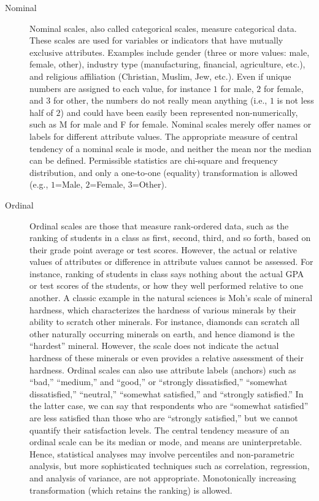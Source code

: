 \begin{description}
	\item[Nominal] Nominal scales, also called categorical scales, measure categorical data. These scales are used for variables or indicators that have mutually exclusive attributes. Examples include gender (three or more values: male, female, other), industry type (manufacturing, financial, agriculture, etc.), and religious affiliation (Christian, Muslim, Jew, etc.). Even if unique numbers are assigned to each value, for instance $ 1 $ for male, $ 2 $ for female, and $ 3 $ for other, the numbers do not really mean anything (i.e., $ 1 $ is not less half of $ 2 $) and could have been easily been represented non-numerically, such as M for male and F for female. Nominal scales merely offer names or labels for different attribute values. The appropriate measure of central tendency of a nominal scale is mode, and neither the mean nor the median can be defined. Permissible statistics are chi-square and frequency distribution, and only a one-to-one (equality) transformation is allowed (e.g., $ 1 $=Male, $ 2 $=Female, $ 3 $=Other).
	
	\item[Ordinal] Ordinal scales are those that measure rank-ordered data, such as the ranking of students in a class as first, second, third, and so forth, based on their grade point average or test scores. However, the actual or relative values of attributes or difference in attribute values cannot be assessed. For instance, ranking of students in class says nothing about the actual GPA or test scores of the students, or how they well performed relative to one another. A classic example in the natural sciences is Moh's scale of mineral hardness, which characterizes the hardness of various minerals by their ability to scratch other minerals. For instance, diamonds can scratch all other naturally occurring minerals on earth, and hence diamond is the ``hardest'' mineral. However, the scale does not indicate the actual hardness of these minerals or even provides a relative assessment of their hardness. Ordinal scales can also use attribute labels (anchors) such as ``bad,'' ``medium,'' and ``good,'' or ``strongly dissatisfied,'' ``somewhat dissatisfied,'' ``neutral,'' ``somewhat satisfied,'' and ``strongly satisfied.'' In the latter case, we can say that respondents who are ``somewhat satisfied'' are less satisfied than those who are ``strongly satisfied,'' but we cannot quantify their satisfaction levels. The central tendency measure of an ordinal scale can be its median or mode, and means are uninterpretable. Hence, statistical analyses may involve percentiles and non-parametric analysis, but more sophisticated techniques such as correlation, regression, and analysis of variance, are not appropriate. Monotonically increasing transformation (which retains the ranking) is allowed. 
	

\end{description}
